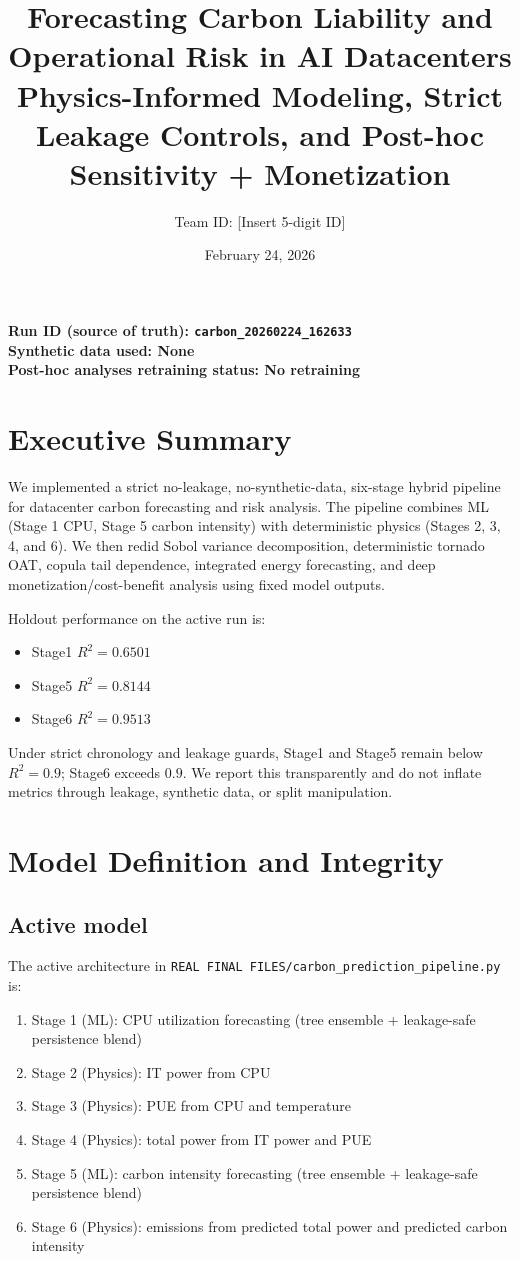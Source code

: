\documentclass[11pt]{article}
\title{Forecasting Carbon Liability and Operational Risk in AI Datacenters\\\large Physics-Informed Modeling, Strict Leakage Controls, and Post-hoc Sensitivity + Monetization}
\author{Team ID: [Insert 5-digit ID]}
\date{February 24, 2026}
\begin{document}
\maketitle

\begin{center}
\textbf{Run ID (source of truth): \texttt{carbon\_20260224\_162633}} \\
\textbf{Synthetic data used: None} \\
\textbf{Post-hoc analyses retraining status: No retraining}
\end{center}

\section*{Executive Summary}
We implemented a strict no-leakage, no-synthetic-data, six-stage hybrid pipeline for datacenter carbon forecasting and risk analysis. The pipeline combines ML (Stage 1 CPU, Stage 5 carbon intensity) with deterministic physics (Stages 2, 3, 4, and 6). We then redid Sobol variance decomposition, deterministic tornado OAT, copula tail dependence, integrated energy forecasting, and deep monetization/cost-benefit analysis using fixed model outputs.

Holdout performance on the active run is:
\begin{itemize}[leftmargin=1.2em]
  \item Stage1 \(R^2=0.6501\)
  \item Stage5 \(R^2=0.8144\)
  \item Stage6 \(R^2=0.9513\)
\end{itemize}

Under strict chronology and leakage guards, Stage1 and Stage5 remain below \(R^2=0.9\); Stage6 exceeds \(0.9\). We report this transparently and do not inflate metrics through leakage, synthetic data, or split manipulation.

\section{Model Definition and Integrity}
\subsection{Active model}
The active architecture in \texttt{REAL FINAL FILES/carbon\_prediction\_pipeline.py} is:
\begin{enumerate}[leftmargin=1.2em]
  \item Stage 1 (ML): CPU utilization forecasting (tree ensemble + leakage-safe persistence blend)
  \item Stage 2 (Physics): IT power from CPU
  \item Stage 3 (Physics): PUE from CPU and temperature
  \item Stage 4 (Physics): total power from IT power and PUE
  \item Stage 5 (ML): carbon intensity forecasting (tree ensemble + leakage-safe persistence blend)
  \item Stage 6 (Physics): emissions from predicted total power and predicted carbon intensity
\end{enumerate}
\end{document}
